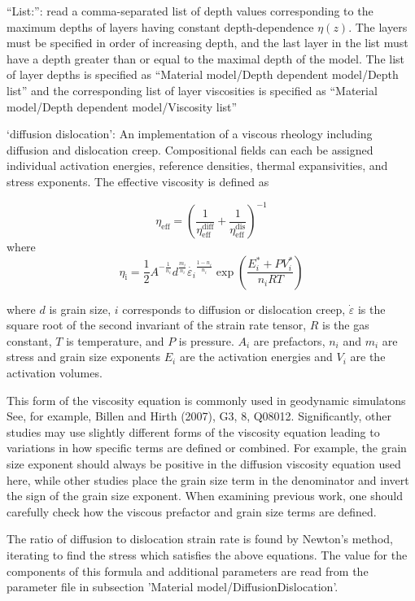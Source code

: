 \begin{itemize}
``List:'': read a comma-separated list of depth values corresponding to the maximum depths of layers having constant depth-dependence $\eta(z)$. The layers must be specified in order of increasing depth, and the last layer in the list must have a depth greater than or equal to the maximal depth of the model. The list of layer depths is specified as ``Material model/Depth dependent model/Depth list'' and the corresponding list of layer viscosities is specified as ``Material model/Depth dependent model/Viscosity list''

`diffusion dislocation': An implementation of a viscous rheology including diffusion and dislocation creep. Compositional fields can each be assigned individual activation energies, reference densities, thermal expansivities, and stress exponents. The effective viscosity is defined as 

\[\eta_{\text{eff}} = \left(\frac{1}{\eta_{\text{eff}}^\text{diff}}+ \frac{1}{\eta_{\text{eff}}^\text{dis}}\right)^{-1}\] where \[\eta_{\text{i}} = \frac{1}{2} A^{-\frac{1}{n_i}} d^\frac{m_i}{n_i} \dot{\varepsilon_i}^{\frac{1-n_i}{n_i}} \exp\left(\frac{E_i^\ast + PV_i^\ast}{n_iRT}\right)\] 

where $d$ is grain size, $i$ corresponds to diffusion or dislocation creep, $\dot{\varepsilon}$ is the square root of the second invariant of the strain rate tensor, $R$ is the gas constant, $T$ is temperature, and $P$ is pressure. $A_i$ are prefactors, $n_i$ and $m_i$ are stress and grain size exponents $E_i$ are the activation energies and $V_i$ are the activation volumes. 

This form of the viscosity equation is commonly used in geodynamic simulatons See, for example, Billen and Hirth (2007), G3, 8, Q08012. Significantly, other studies may use slightly different forms of the viscosity equation leading to variations in how specific terms are defined or combined. For example, the grain size exponent should always be positive in the diffusion viscosity equation used here, while other studies place the grain size term in the denominator and invert the sign of the grain size exponent. When examining previous work, one should carefully check how the viscous prefactor and grain size terms are defined.  

The ratio of diffusion to dislocation strain rate is found by Newton's method, iterating to find the stress which satisfies the above equations. The value for the components of this formula and additional parameters are read from the parameter file in subsection 'Material model/DiffusionDislocation'.


\end{itemize}
